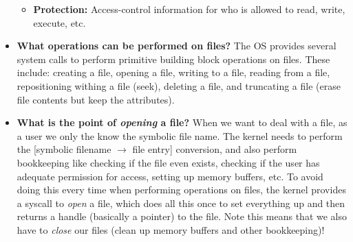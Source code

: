 \documentclass[12pt]{article}
\begin{document}
\begin{itemize}
\begin{itemize}
            \item \textbf{Protection:} Access-control information for who is allowed to read, write, execute, etc.
        \end{itemize}
    \item \textbf{What operations can be performed on files?} The OS provides several system calls to perform primitive building block operations on files. These include: creating a file, opening a file, writing to a file, reading from a file, repositioning withing a file (seek), deleting a file, and truncating a file (erase file contents but keep the attributes).
    \item \textbf{What is the point of \textit{opening} a file?} When we want to deal with a file, as a user we only the know the symbolic file name. The kernel needs to perform the [symbolic filename \(\rightarrow\) file entry] conversion, and also perform bookkeeping like checking if the file even exists, checking if the user has adequate permission for access, setting up memory buffers, etc. To avoid doing this every time when performing operations on files, the kernel provides a syscall to \textit{open} a file, which does all this once to set everything up and then returns a handle (basically a pointer) to the file. Note this means that we also have to \textit{close} our files (clean up memory buffers and other bookkeeping)!
\end{itemize}


\end{document}
